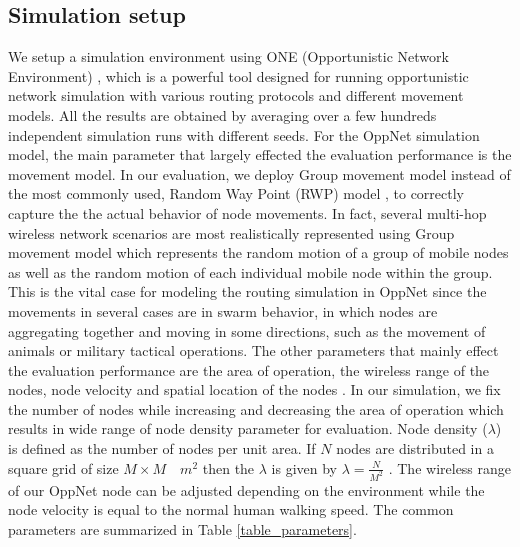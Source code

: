 \documentclass[conference]{IEEEtran}
\begin{document}
\subsection{Simulation setup}
We setup a simulation environment using ONE (Opportunistic Network Environment) \cite{Keranen2009b}, which is a powerful tool designed for running opportunistic network simulation with various routing protocols and different movement models.
All the results are obtained by averaging over a few hundreds independent simulation runs with different seeds.
For the OppNet simulation model, the main parameter that largely effected the evaluation performance is the movement model.
In our evaluation, we deploy Group movement model instead of the most commonly used, Random Way Point (RWP) model \cite{Batabyal2012}, to correctly capture the the actual behavior of node movements.
In fact, several multi-hop wireless network scenarios are most realistically represented using Group movement model \cite{Blakely2004} which represents the random motion of a group of mobile nodes as well as the random motion of each individual mobile node within the group.
This is the vital case for modeling the routing simulation in OppNet since the movements in several cases are in swarm behavior, in which nodes are aggregating together and moving in some directions, such as the movement of animals or military tactical operations.
The other parameters that mainly effect the evaluation performance are the area of operation, the wireless range of the nodes, node velocity and spatial location of the nodes \cite{Batabyal2012}. 
In our simulation, we fix the number of nodes while increasing and decreasing the area of operation which results in wide range of node density parameter for evaluation.
Node density ($\lambda$) is defined as the number of nodes per unit area. 
If $N$ nodes are distributed in a square grid of size $M \times M \quad{ m }^{ 2 }$ then the $\lambda$ is given by $\lambda =\frac { N }{ { M }^{ 2 } } $ . 
The wireless range of our OppNet node can be adjusted depending on the environment while the node velocity is equal to the normal human walking speed.
The common parameters are summarized in Table \ref{table_parameters}.

\end{document}
